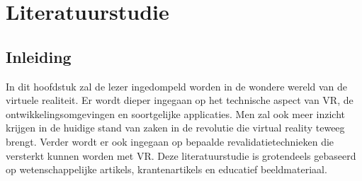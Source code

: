 \chapter{Literatuurstudie}
\label{ch:stand-van-zaken}




%




\section{Inleiding}
In dit hoofdstuk zal de lezer ingedompeld worden in de wondere wereld van de virtuele realiteit. Er wordt dieper ingegaan op het technische aspect van VR, de ontwikkelingsomgevingen en soortgelijke applicaties. Men zal ook meer inzicht krijgen in de huidige stand van zaken in de revolutie die virtual reality teweeg brengt. Verder wordt er ook ingegaan op bepaalde revalidatietechnieken die versterkt kunnen worden met VR. Deze literatuurstudie is grotendeels gebaseerd op wetenschappelijke artikels, krantenartikels en educatief beeldmateriaal.

